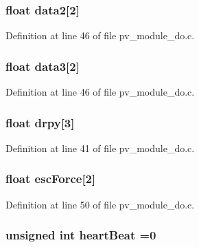 \subsubsection[{\texorpdfstring{data2}{data2}}]{\setlength{\rightskip}{0pt plus 5cm}float data2\mbox{[}2\mbox{]}}\hypertarget{group__app__do_ga2241fa8ef7e6a940cd8ce8dc13d8b4e8}{}\label{group__app__do_ga2241fa8ef7e6a940cd8ce8dc13d8b4e8}


Definition at line 46 of file pv\+\_\+module\+\_\+do.\+c.

\subsubsection[{\texorpdfstring{data3}{data3}}]{\setlength{\rightskip}{0pt plus 5cm}float data3\mbox{[}2\mbox{]}}\hypertarget{group__app__do_gafb91c0f3a7dabe2beb8c046ff3cd4613}{}\label{group__app__do_gafb91c0f3a7dabe2beb8c046ff3cd4613}


Definition at line 46 of file pv\+\_\+module\+\_\+do.\+c.

\subsubsection[{\texorpdfstring{drpy}{drpy}}]{\setlength{\rightskip}{0pt plus 5cm}float drpy\mbox{[}3\mbox{]}}\hypertarget{group__app__do_ga09c67ab670708cf621c9853aeb34fc2c}{}\label{group__app__do_ga09c67ab670708cf621c9853aeb34fc2c}


Definition at line 41 of file pv\+\_\+module\+\_\+do.\+c.

\subsubsection[{\texorpdfstring{esc\+Force}{escForce}}]{\setlength{\rightskip}{0pt plus 5cm}float esc\+Force\mbox{[}2\mbox{]}}\hypertarget{group__app__do_ga7b919fc59fbb86e34627c65320446dd3}{}\label{group__app__do_ga7b919fc59fbb86e34627c65320446dd3}


Definition at line 50 of file pv\+\_\+module\+\_\+do.\+c.

\subsubsection[{\texorpdfstring{heart\+Beat}{heartBeat}}]{\setlength{\rightskip}{0pt plus 5cm}unsigned int heart\+Beat =0}\hypertarget{group__app__do_ga24475be702ffcc5a6f0a5557040368ef}{}\label{group__app__do_ga24475be702ffcc5a6f0a5557040368ef}


